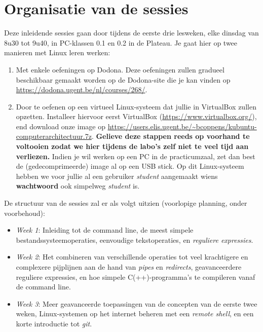 \documentclass[a4paper,twoside,openany]{memoir}
\begin{document}
\section{Organisatie van de sessies}

Deze inleidende sessies gaan door tijdens de eerste drie lesweken, elke dinsdag
van 8u30 tot 9u40, in PC-klassen 0.1 en 0.2 in de Plateau. Je gaat hier op twee
manieren met Linux leren werken:

\begin{enumerate}

  \item Met enkele oefeningen op Dodona. Deze oefeningen zullen gradueel
    beschikbaar gemaakt worden op de Dodona-site die je kan vinden op
    \url{https://dodona.ugent.be/nl/courses/268/}.

  \item Door te oefenen op een virtueel Linux-systeem dat jullie in VirtualBox
    zullen opzetten. Installeer hiervoor eerst VirtualBox
    (\url{https://www.virtualbox.org/}), end download onze image op
    \url{https://users.elis.ugent.be/~bcoppens/kubuntu-computerarchitectuur.7z}.
    \textbf{Gelieve deze stappen reeds op voorhand te voltooien zodat we hier
    tijdens de labo's zelf niet te veel tijd aan verliezen.} Indien je wil
    werken op een PC in de practicumzaal, zet dan best de (gedecomprimeerde)
    image al op een USB stick. Op dit Linux-systeem hebben we voor jullie al
    een gebruiker \emph{student} aangemaakt wiens \textbf{wachtwoord} ook
    simpelweg \emph{student} is.

\end{enumerate}

De structuur van de sessies zal er als volgt uitzien (voorlopige planning, onder voorbehoud):

\begin{itemize}

  \item \emph{Week 1}: Inleiding tot de command line, de meest simpele
    bestandssysteemoperaties, eenvoudige tekstoperaties, en \emph{reguliere
    expressies}.

  \item \emph{Week 2}: Het combineren van verschillende operaties tot veel
    krachtigere en complexere pijplijnen aan de hand van \emph{pipes} en
    \emph{redirects}, geavanceerdere reguliere expressies, en hoe simpele
    C(++)-programma's te compileren vanaf de command line.

  \item \emph{Week 3}: Meer geavanceerde toepassingen van de concepten van de
    eerste twee weken, Linux-systemen op het internet beheren met een
    \emph{remote shell}, en een korte introductie tot \emph{git}.

\end{itemize}
\end{document}
